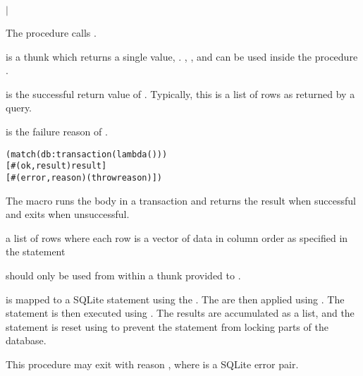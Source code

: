 \begin{procedure}
\end{procedure}
\returns{}
 $|$

The  procedure calls .

 is a thunk which returns a single value,
. , , and
 can be used inside the procedure .

 is the successful return value of . Typically,
this is a list of rows as returned by a  query.

 is the failure reason of .

\begin{syntax}
\end{syntax}
\expandsto{} \antipar\begin{alltt}
(match (db:transaction  (lambda ()  \etc))
  [#(ok ,result) result]
  [#(error ,reason) (throw reason)])
\end{alltt}

The  macro runs the body in a transaction and
returns the result when successful and exits when unsuccessful.

\begin{procedure}
\end{procedure}
\returns{}
a list of rows where each row is a vector of data in column order as
specified in the  statement

 should only be used from within a thunk 
provided to .

 is mapped to a SQLite statement using the
. The  are then applied using
. The statement is then executed using
. The results are accumulated as a list, and the
statement is reset using  to prevent the
statement from locking parts of the database.

This procedure may exit with reason , where  is a SQLite error pair.


